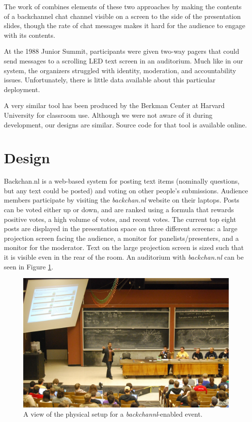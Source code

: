 The work of \citet{Rekimoto:1998jy} combines elements of these two approaches by making the contents of a backchannel chat channel visible on a screen to the side of the presentation slides, though the rate of chat messages makes it hard for the audience to engage with its contents. 

At the 1988 Junior Summit, participants were given two-way pagers that could send messages to a scrolling LED text screen in an auditorium. Much like in our system, the organizers struggled with identity, moderation, and accountability issues. Unfortunately, there is little data available about this particular deployment. \citep{Chesnais:uh}

A very similar tool has been produced by the Berkman Center at Harvard University for classroom use. Although we were not aware of it during development, our designs are similar. Source code for that tool is available online. \citep{Anonymous:DYsIxdHV}


\section{Design}

Backchan.nl is a web-based system for posting text items (nominally questions, but any text could be posted) and voting on other people's submissions. Audience members participate by visiting the \emph{backchan.nl} website on their laptops. Posts can be voted either up or down, and are ranked using a formula that rewards positive votes, a high volume of votes, and recent votes. The current top eight posts are displayed in the presentation space on three different screens: a large projection screen facing the audience, a monitor for panelists/presenters, and a monitor for the moderator. Text on the large projection screen is sized such that it is visible even in the rear of the room. An auditorium with \emph{backchan.nl} can be seen in Figure \ref{fig:backchannl_physical}. 

\begin{figure}[t]
	\includegraphics{figures/backchannl/roflcon_photo.jpg}
	\caption{A view of the physical setup for a \emph{backchannl}-enabled event.}
	\label{fig:backchannl_physical}
\end{figure}

